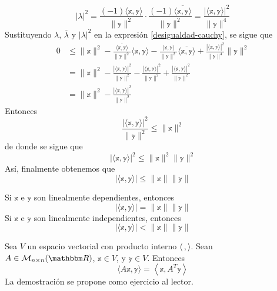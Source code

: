 \begin{theorem}
    $$|\lambda|^2 = \frac{(-1)\langle \mathbb{x}, \mathbb{y} \rangle}{\| \mathbb{y} \|^2} \cdot \frac{(-1)\overline{\langle \mathbb{x}, \mathbb{y} \rangle}}{\| \mathbb{y} \|^2} = \frac{|\langle \mathbb{x}, \mathbb{y} \rangle|^2}{\| \mathbb{y} \|^4}$$
    Sustituyendo $\lambda$, $\overline{\lambda}$ y $|\lambda|^2$ en la expresión \eqref{desigualdad-cauchy}, se sigue que
    \begin{align*}
        0 & \leq \| \mathbb{x} \|^2 - \frac{\overline{\langle \mathbb{x}, \mathbb{y} \rangle}}{\| \mathbb{y} \|^2} \langle \mathbb{x}, \mathbb{y} \rangle - \frac{\langle \mathbb{x}, \mathbb{y} \rangle}{\| \mathbb{y} \|^2} \overline{\langle \mathbb{x}, \mathbb{y} \rangle} + \frac{|\langle \mathbb{x}, \mathbb{y} \rangle|^2}{\| \mathbb{y} \|^4} \| \mathbb{y} \|^2 \\
        & = \| \mathbb{x} \|^2 - \frac{|\langle \mathbb{x}, \mathbb{y} \rangle|^2}{\| \mathbb{y} \|^2} - \frac{|\langle \mathbb{x}, \mathbb{y} \rangle|^2}{\| \mathbb{y} \|^2} + \frac{|\langle \mathbb{x}, \mathbb{y} \rangle|^2}{\| \mathbb{y} \|^2} \\
        & = \| \mathbb{x} \|^2 - \frac{|\langle \mathbb{x}, \mathbb{y} \rangle|^2}{\| \mathbb{y} \|^2}
    \end{align*}
    Entonces
    $$\frac{|\langle \mathbb{x}, \mathbb{y} \rangle|^2}{\| \mathbb{y} \|^2} \leq \| \mathbb{x} \|^2$$
    de donde se sigue que
    $$|\langle \mathbb{x}, \mathbb{y} \rangle|^2 \leq \| \mathbb{x} \|^2 \| \mathbb{y} \|^2$$
    Así, finalmente obtenemos que
    $$|\langle \mathbb{x}, \mathbb{y} \rangle| \leq \| \mathbb{x} \| \| \mathbb{y} \|$$
\end{theorem}

\begin{observation}
    Si $\mathbb{x}$ e $\mathbb{y}$ son linealmente dependientes, entonces
    $$|\langle \mathbb{x}, \mathbb{y} \rangle| = \| \mathbb{x} \| \| \mathbb{y} \|$$
    Si $\mathbb{x}$ e $\mathbb{y}$ son linealmente independientes, entonces
    $$|\langle \mathbb{x}, \mathbb{y} \rangle| < \| \mathbb{x} \| \| \mathbb{y} \|$$
\end{observation}

\begin{theorem}\label{JAJSJSJSJJSJSHSTTYQUUQHIAIIQVVCGTQYHHAHAHA}
    Sea $V$ un espacio vectorial con producto interno $\langle \, , \rangle$. Sean $A \in \mathcal{M}_{n \times n}(\RR)$, $\mathbb{x} \in V$, y $\mathbb{y} \in V$. Entonces
    $$\langle A\mathbb{x}, \mathbb{y} \rangle = \left\langle \mathbb{x}, A^T\mathbb{y} \right\rangle$$
    \demostracion La demostración se propone como ejercicio al lector.
\end{theorem}

